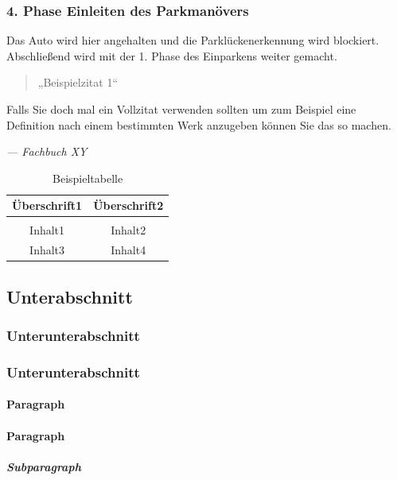 \subsubsection{4. Phase Einleiten des Parkmanövers}
Das Auto wird hier angehalten und die Parklückenerkennung wird blockiert. Abschließend wird mit der 1. Phase des Einparkens weiter gemacht.

\begin{quote}
	„Beispielzitat 1“ \cite{knuth:1984} \cite{IEEEexample:texfaq}
\end{quote}

\begin{formal}
	Falls Sie doch mal ein Vollzitat verwenden sollten um zum Beispiel eine Definition nach einem 		    bestimmten Werk anzugeben können Sie das so machen.
	\begin{flushright}
		\textit{--- Fachbuch XY \cite{IEEEexample:texfaq}}
	\end{flushright}
\end{formal}

\begin{table}[H]
	\centering
	\caption{Beispieltabelle}
	\begin{tabular}{c | c}
		\hline 
		\large{Überschrift1} & \large{Überschrift2} \\
		\hline \\
		Inhalt1 & Inhalt2\\
		Inhalt3 & Inhalt4\\
	\end{tabular}
\end{table}

\subsection{Unterabschnitt}
\blindtext
\subsubsection{Unterunterabschnitt}
\blindtext
\subsubsection{Unterunterabschnitt}
\blindtext
\paragraph{Paragraph}
\blindtext
\paragraph{Paragraph}
\blindtext
\subparagraph{Subparagraph}
\blindtext